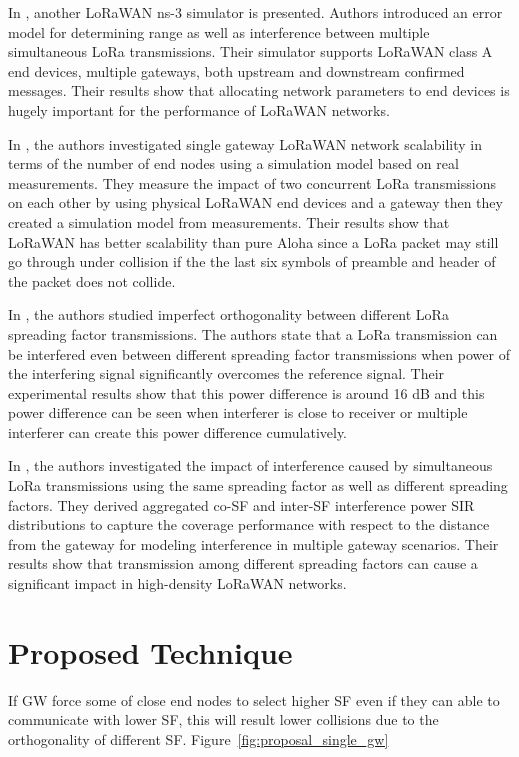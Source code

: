 \documentclass[conference]{IEEEtran}
\begin{document}
\par In \cite{8090518}, another LoRaWAN ns-3 simulator is presented. Authors introduced an error model for determining range as well as interference between multiple simultaneous LoRa transmissions. Their simulator supports LoRaWAN class A end devices, multiple gateways, both upstream and downstream confirmed messages. Their results show that allocating network parameters to end devices is hugely important for the performance of LoRaWAN networks.

\par In \cite{s17061193}, the authors investigated single gateway LoRaWAN network scalability in terms of the number of end nodes using a simulation model based on real measurements. They measure the impact of two concurrent LoRa transmissions on each other by using physical LoRaWAN end devices and a gateway then they created a simulation model from measurements. Their results show that LoRaWAN has better scalability than pure Aloha since a LoRa packet may still go through under collision if the the last six symbols of preamble and header of the packet does not collide.

\par In \cite{8267219}, the authors studied imperfect orthogonality between different LoRa spreading factor transmissions. The authors state that a LoRa transmission can be interfered even between different spreading factor transmissions when power of the interfering signal significantly overcomes the reference signal. Their experimental results show that this power difference is around 16 dB and this power difference can be seen when  interferer is close to receiver or multiple interferer can create this power difference cumulatively. 

\par In \cite{8430542}, the authors investigated the impact of interference caused by simultaneous LoRa transmissions using the same spreading factor as well as different spreading factors. They derived aggregated co-SF and inter-SF interference power SIR distributions to capture the coverage performance with respect to the distance from the gateway for modeling interference in multiple gateway scenarios. Their results show that transmission among different spreading factors can cause a significant impact in high-density LoRaWAN networks.

\section{Proposed Technique}
\par If GW force some of close end nodes to select higher SF even if they can able to communicate with lower SF, this will result lower collisions due to the orthogonality of different SF. Figure~\ref{fig:proposal_single_gw}
\end{document}
